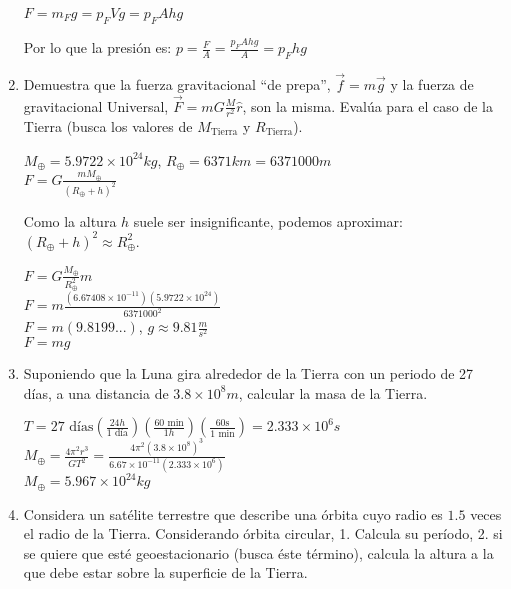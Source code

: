 \documentclass[10pt, a4paper]{article}
\begin{document}
\begin{enumerate}
\begin{center}
            $F=m_F\si{g}=p_F V\si{g}=p_F Ah\si{g}$

            Por lo que la presión es: $p=\frac{F}{A}=\frac{p_F Ah\si{g}}{A}=p_F h\si{g}$

        \end{center}

        \item Demuestra que la fuerza gravitacional “de prepa”, $\vec{f}=m\vec{g}$ y la 
        fuerza de gravitacional Universal, $\vec{F}=mG\frac{M}{r^2}\hat{r}$, son la misma. 
        Evalúa para el caso de la Tierra (busca los valores de $M_{\text{Tierra}}$ y $R_{\text{Tierra}}$).

        \begin{center}
            $M_\oplus= 5.9722 \times 10^{24}\si{kg}$, $R_\oplus= 6371 \si{km}=6371000\si{m}$\\
            $F = G\frac{m M_\oplus}{(R_\oplus+h)^2}$

            Como la altura $h$ suele ser insignificante, podemos aproximar:\\
             $(R_\oplus+h)^2\approx R_\oplus^2$.

            $F = G\frac{M_\oplus}{R_\oplus^2}m$\\
            $F = m\frac{(6.67408\times 10^{-11})(5.9722\times 10^{24})}{6371000^2}$\\
            $F = m(9.8199...)$, $\si{g}\approx9.81\frac{\si{m}}{\si{s^2}}$\\
            $F = mg$

        \end{center}

        \item Suponiendo que la Luna gira alrededor de la Tierra con un periodo de 27
        días, a una distancia de $3.8 \times 10^8 \si{m}$, calcular la masa de la Tierra.

        \begin{center}
            $T=27\si{\text{ días}}(\frac{24\si{h}}{1\si{\text{ día}}})(\frac{60\si{\text{ min}}}{1\si{h}})(\frac{60\si{\text{s}}}{1\si{\text{ min}}})= 2.333 \times 10^6 \si{s}$\\
            $M_\oplus=\frac{4\pi^2r^3}{GT^2}=\frac{4\pi^2(3.8\times 10^8)^3}{6.67\times 10^{-11}(2.333\times 10^6)}$\\
            $M_\oplus=5.967\times 10^{24} \si{kg}$
        \end{center}

        \item Considera un satélite terrestre que describe una órbita cuyo radio es $1.5$
        veces el radio de la Tierra. Considerando órbita circular, 1. Calcula su
        período, 2. si se quiere que esté geoestacionario (busca éste término), calcula
        la altura a la que debe estar sobre la superficie de la Tierra.


\end{enumerate}
\end{document}
